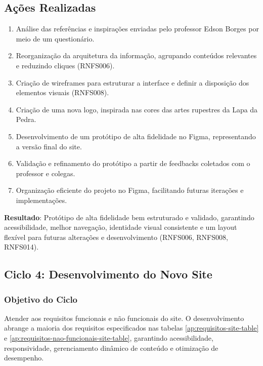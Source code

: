 \subsection{Ações Realizadas}
\begin{enumerate}
    \item Análise das referências e inspirações enviadas pelo professor Edson Borges por meio de um questionário.
    \item Reorganização da arquitetura da informação, agrupando conteúdos relevantes e reduzindo cliques (RNFS006).
    \item Criação de wireframes para estruturar a interface e definir a disposição dos elementos visuais (RNFS008).
    \item Criação de uma nova logo, inspirada nas cores das artes rupestres da Lapa da Pedra.
    \item Desenvolvimento de um protótipo de alta fidelidade no Figma, representando a versão final do site.
    \item Validação e refinamento do protótipo a partir de feedbacks coletados com o professor e colegas.
    \item Organização eficiente do projeto no Figma, facilitando futuras iterações e implementações.
\end{enumerate}

\textbf{Resultado}: Protótipo de alta fidelidade bem estruturado e validado, garantindo acessibilidade, melhor navegação, identidade visual consistente e um layout flexível para futuras alterações e desenvolvimento (RNFS006, RNFS008, RNFS014).
\subsection*{Ciclo 4: Desenvolvimento do Novo Site} \label{subsec:ciclo4}

\subsubsection*{Objetivo do Ciclo}
Atender aos requisitos funcionais e não funcionais do site. O desenvolvimento abrange a maioria dos requisitos especificados nas tabelas \ref{ap:requisitos-site-table} e \ref{ap:requisitos-nao-funcionais-site-table}, garantindo acessibilidade, responsividade, gerenciamento dinâmico de conteúdo e otimização de desempenho.

